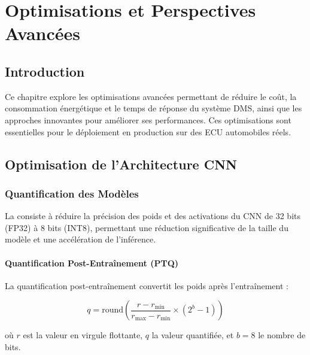 
\chapter{Optimisations et Perspectives Avancées}

\section{Introduction}

Ce chapitre explore les optimisations avancées permettant de réduire le coût, la consommation énergétique et le temps de réponse du système DMS, ainsi que les approches innovantes pour améliorer ses performances. Ces optimisations sont essentielles pour le déploiement en production sur des ECU automobiles réels.

\section{Optimisation de l'Architecture CNN}

\subsection{Quantification des Modèles}

La  consiste à réduire la précision des poids et des activations du CNN de 32 bits (FP32) à 8 bits (INT8), permettant une réduction significative de la taille du modèle et une accélération de l'inférence.

\subsubsection{Quantification Post-Entraînement (PTQ)}

La quantification post-entraînement convertit les poids après l'entraînement :

\begin{equation}
q = \text{round}\left(\frac{r - r_{\min}}{r_{\max} - r_{\min}} \times (2^b - 1)\right)
\label{eq:quantization}
\end{equation}

où $r$ est la valeur en virgule flottante, $q$ la valeur quantifiée, et $b = 8$ le nombre de bits.

